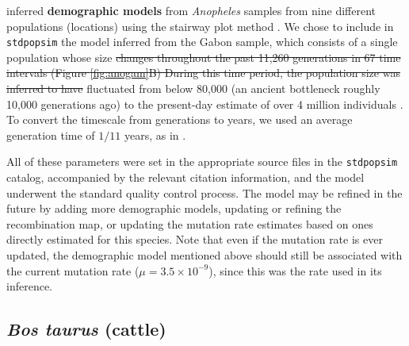 \documentclass[hidelinks]{article}
\newcommand{\stdpopsim}{\texttt{stdpopsim}\xspace}
\providecommand{\DIFaddtex}[1]{{\protect\color{blue}\uwave{#1}}} %
\providecommand{\DIFdeltex}[1]{{\protect\color{red}\sout{#1}}}                      %
\providecommand{\DIFaddbegin}{} %
\providecommand{\DIFaddend}{} %
\providecommand{\DIFdelbegin}{} %
\providecommand{\DIFdelend}{} %
\providecommand{\DIFadd}[1]{\texorpdfstring{\DIFaddtex{#1}}{#1}} %
\providecommand{\DIFdel}[1]{\texorpdfstring{\DIFdeltex{#1}}{}} %
\newcommand{\DIFscaledelfig}{0.5}
\newlength{\DIFdelgraphicswidth} %
\newlength{\DIFdelgraphicsheight} %
\newcommand{\DIFaddincludegraphics}[2][]{{\color{blue}\fbox{\DIFOincludegraphics[#1]{#2}}}} %
\newcommand{\DIFdelincludegraphics}[2][]{%
\sbox{\DIFdelgraphicsbox}{\DIFOincludegraphics[#1]{#2}}%
\settoboxwidth{\DIFdelgraphicswidth}{\DIFdelgraphicsbox} %
\settoboxtotalheight{\DIFdelgraphicsheight}{\DIFdelgraphicsbox} %
\scalebox{\DIFscaledelfig}{%
\parbox[b]{\DIFdelgraphicswidth}{\usebox{\DIFdelgraphicsbox}\\[-\baselineskip] \rule{\DIFdelgraphicswidth}{0em}}\llap{\resizebox{\DIFdelgraphicswidth}{\DIFdelgraphicsheight}{%
\setlength{\unitlength}{\DIFdelgraphicswidth}%
\begin{picture}(1,1)%
\thicklines\linethickness{2pt} %
{\color[rgb]{1,0,0}\put(0,0){\framebox(1,1){}}}%
{\color[rgb]{1,0,0}\put(0,0){\line( 1,1){1}}}%
{\color[rgb]{1,0,0}\put(0,1){\line(1,-1){1}}}%
\end{picture}%
}\hspace*{3pt}}} %
} %
\DeclareRobustCommand{\DIFaddbegin}{\DIFOaddbegin \let\includegraphics\DIFaddincludegraphics} %
\DeclareRobustCommand{\DIFaddend}{\DIFOaddend \let\includegraphics\DIFOincludegraphics} %
\DeclareRobustCommand{\DIFdelbegin}{\DIFOdelbegin \let\includegraphics\DIFdelincludegraphics} %
\DeclareRobustCommand{\DIFdelend}{\DIFOaddend \let\includegraphics\DIFOincludegraphics} %
\begin{document}
\DIFdelend %
\citet{Miles2017} inferred \textbf{demographic models} from \textit{Anopheles} samples from nine different populations (locations) using the stairway plot method \citep{Liu2015}.
We chose to include in \stdpopsim the model inferred from the Gabon sample, 
which consists of a single population whose size \DIFdelbegin \DIFdel{changes throughout the past 11,260 generations in 67 time intervals (Figure \ref{fig:anogam}B)
During this time period, the population size was inferred to have }\DIFdelend fluctuated from below 80,000
(an ancient bottleneck roughly 10,000 generations ago) to the present-day estimate of over 4 million individuals \DIFaddbegin \DIFadd{(Figure \ref{fig:anogam}B)}\DIFaddend .
To convert the timescale from generations to years,
we used an average generation time of $1/11$ years,
as in \cite{Miles2017}.


All of these parameters were set in the appropriate source files in the \stdpopsim catalog,
accompanied by the relevant citation information,
and the model underwent the standard quality control process.
The model may be refined in the future by adding more demographic models,
updating or refining the recombination map,
or updating the mutation rate estimates based on ones directly estimated for this species.
Note that even if the mutation rate is ever updated,
the demographic model mentioned above should still be associated with the current
mutation rate ($\mu=3.5 \times 10^{-9}$),
since this was the rate used in its inference.


\subsection*{\texorpdfstring{\emph{Bos taurus} (cattle)}{Bos taurus (cattle)}}
    \label{bos-taurus}
\end{document}
